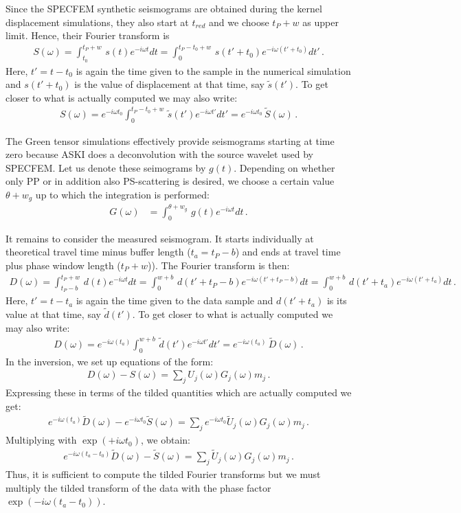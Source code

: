 Since the SPECFEM synthetic seismograms are obtained during the kernel displacement simulations, they also start at $t_{red}$ and we choose $t_P+w$ as upper limit. Hence, their Fourier transform is
\begin{align}
S(\omega) = \int_{t_0}^{t_P+w}\,s(t)e^{-i\omega t} dt = \int_{0}^{t_P-t_0+w}\,s(t'+t_0)e^{-i\omega (t'+t_0)} dt' \,.
\end{align}
Here, $t'=t-t_0$ is again the time given to the sample in the numerical simulation and $s(t'+t_0)$ is the value of displacement at that time, say $\tilde{s}(t')$. To get closer to what is actually computed we may also write:
\begin{align}
	S(\omega) = e^{-i\omega t_0}\int_{0}^{t_P-t_0+w}\,\tilde{s}(t')e^{-i\omega t'} dt' = e^{-i\omega t_0}\,\tilde{S}(\omega) \,.
\end{align}

The Green tensor simulations effectively provide seismograms starting at time zero because ASKI does a deconvolution with the source wavelet used by SPECFEM. Let us denote these seimograms by $g(t)$. Depending on whether only PP or in addition also PS-scattering is desired, we choose a certain value $\theta+w_g$ up to which the integration is performed:
\begin{align}
	G(\omega) &= \int_0^{\theta+w_g}\,g(t)e^{-i\omega t} dt \,.
\end{align}

It remains to consider the measured seismogram. It starts individually at theoretical travel time minus buffer length ($t_a=t_P-b$) and ends at travel time plus phase window length ($t_P+w$)). The Fourier transform is then:
\begin{align}
D(\omega) = \int_{t_P-b}^{t_P+w}\,d(t)e^{-i\omega t} dt = \int_{0}^{w+b}\,d(t'+t_P-b)e^{-i\omega (t'+t_P-b)} dt = \int_{0}^{w+b}\,d(t'+t_a)e^{-i\omega (t'+t_a)} dt \,.
\end{align}
Here, $t'=t-t_a$ is again the time given to the data sample and $d(t'+t_a)$ is its value at that time, say $\tilde{d}(t')$. To get closer to what is actually computed we may also write:
\begin{align}
	D(\omega) = e^{-i\omega (t_a)}\int_{0}^{w+b}\,\tilde{d}(t')e^{-i\omega t'} dt' = e^{-i\omega (t_a)}\,\tilde{D}(\omega) \,.
\end{align}
%
In the inversion, we set up equations of the form:
\begin{align}
	D(\omega)-S(\omega) = \sum_j U_j(\omega)G_j(\omega) m_j \,.
\end{align}
Expressing these in terms of the tilded quantities which are actually computed we get:
\begin{align}
	e^{-i\omega (t_a)}\tilde{D}(\omega)-e^{-i\omega t_0}\tilde{S}(\omega) = \sum_j e^{-i\omega t_0}\tilde{U}_j(\omega)G_j(\omega) m_j \,.
\end{align}
Multiplying with $\exp(+i\omega t_0)$, we obtain:
\begin{align}
	e^{-i\omega (t_a-t_0)}\tilde{D}(\omega)-\tilde{S}(\omega) = \sum_j \tilde{U}_j(\omega)G_j(\omega) m_j \,.
\end{align}
Thus, it is sufficient to compute the tilded Fourier transforms but we must multiply the tilded transform of the data with the phase factor $\exp(-i\omega (t_a-t_0))$.
%
